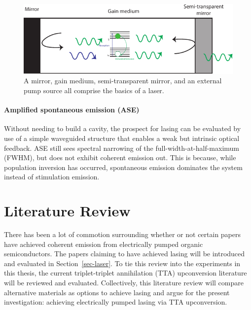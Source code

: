 \documentclass[
  letterpaper,
  DIV=11,
  numbers=noendperiod,
  oneside]{scrreprt}
\begin{document}
\begin{figure}

{\centering \includegraphics{./images/laseramp.pdf}

}

\caption{\label{fig-laseramp}A mirror, gain medium, semi-transparent
mirror, and an external pump source all comprise the basics of a laser.}

\end{figure}

\hypertarget{amplified-spontaneous-emission-ase}{%
\subsubsection{Amplified spontaneous emission
(ASE)}\label{amplified-spontaneous-emission-ase}}

Without needing to build a cavity, the prospect for lasing can be
evaluated by use of a simple waveguided structure that enables a weak
but intrinsic optical feedback. ASE still sees spectral narrowing of the
full-width-at-half-maximum (FWHM), but does not exhibit coherent
emission out. This is because, while population inversion has occurred,
spontaneous emission dominates the system instead of stimulation
emission.


\hypertarget{literature-review}{%
\chapter{Literature Review}\label{literature-review}}

There has been a lot of commotion surrounding whether or not certain
papers have achieved coherent emission from electrically pumped organic
semiconductors. The papers claiming to have achieved lasing will be
introduced and evaluated in Section~\ref{sec-laser}. To tie this review
into the experiments in this thesis, the current triplet-triplet
annihilation (TTA) upconversion literature will be reviewed and
evaluated. Collectively, this literature review will compare alternative
materials as options to achieve lasing and argue for the present
investigation: achieving electrically pumped lasing via TTA
upconversion.
\end{document}

